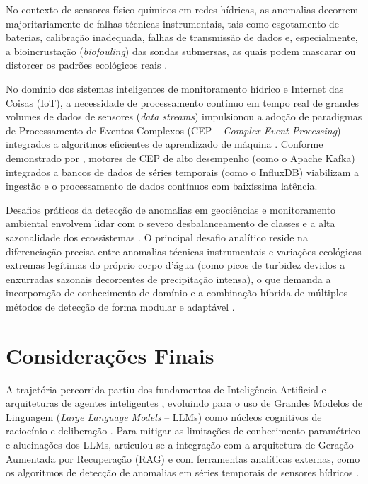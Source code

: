 No contexto de sensores físico-químicos em redes hídricas, as anomalias decorrem majoritariamente de falhas técnicas instrumentais, tais como esgotamento de baterias, calibração inadequada, falhas de transmissão de dados e, especialmente, a bioincrustação (\textit{biofouling}) das sondas submersas, as quais podem mascarar ou distorcer os padrões ecológicos reais \cite{leigh2019framework}.

No domínio dos sistemas inteligentes de monitoramento hídrico e Internet das Coisas (IoT), a necessidade de processamento contínuo em tempo real de grandes volumes de dados de sensores (\textit{data streams}) impulsionou a adoção de paradigmas de Processamento de Eventos Complexos (CEP -- \textit{Complex Event Processing}) integrados a algoritmos eficientes de aprendizado de máquina \cite{sun2019building}. Conforme demonstrado por , motores de CEP de alto desempenho (como o Apache Kafka) integrados a bancos de dados de séries temporais (como o InfluxDB) viabilizam a ingestão e o processamento de dados contínuos com baixíssima latência.

Desafios práticos da detecção de anomalias em geociências e monitoramento ambiental envolvem lidar com o severo desbalanceamento de classes e a alta sazonalidade dos ecossistemas \cite{leigh2019framework, sun2019building}. O principal desafio analítico reside na diferenciação precisa entre anomalias técnicas instrumentais e variações ecológicas extremas legítimas do próprio corpo d'água (como picos de turbidez devidos a enxurradas sazonais decorrentes de precipitação intensa), o que demanda a incorporação de conhecimento de domínio e a combinação híbrida de múltiplos métodos de detecção de forma modular e adaptável \cite{leigh2019framework, sun2019building}.

\section{Considerações Finais}
\label{sec:conclusao_fundamentacao}

A trajetória percorrida partiu dos fundamentos de Inteligência Artificial e arquiteturas de agentes inteligentes \cite{muller1999, russell2021artificial}, evoluindo para o uso de Grandes Modelos de Linguagem (\textit{Large Language Models} -- LLMs) como núcleos cognitivos de raciocínio e deliberação \cite{cheng2026, zhao2026survey}. Para mitigar as limitações de conhecimento paramétrico e alucinações dos LLMs, articulou-se a integração com a arquitetura de Geração Aumentada por Recuperação (RAG) \cite{lewis2020rag} e com ferramentas analíticas externas, como os algoritmos de detecção de anomalias em séries temporais de sensores hídricos \cite{leigh2019framework, sun2019building}. 